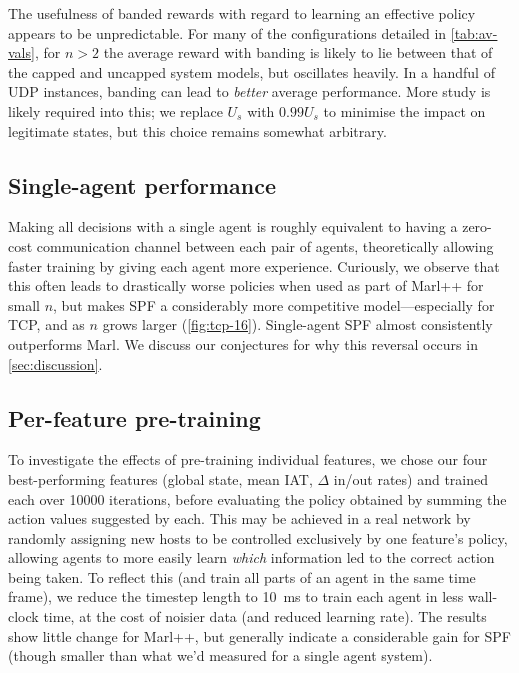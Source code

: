 \documentclass[conference, a4paper, 10pt, times]{IEEEtran}
\begin{document}
The usefulness of banded rewards with regard to learning an effective policy appears to be unpredictable.
For many of the configurations detailed in \cref{tab:av-vals}, for $n>2$ the average reward with banding is likely to lie between that of the capped and uncapped system models, but oscillates heavily.
In a handful of UDP instances, banding can lead to \emph{better} average performance.
More study is likely required into this; we replace $U_s$ with $0.99U_s$ to minimise the impact on legitimate states, but this choice remains somewhat arbitrary.

\subsection{Single-agent performance}
Making all decisions with a single agent is roughly equivalent to having a zero-cost communication channel between each pair of agents, theoretically allowing faster training by giving each agent more experience.
Curiously, we observe that this often leads to drastically worse policies when used as part of Marl++ for small $n$, but makes SPF a considerably more competitive model---especially for TCP, and as $n$ grows larger (\cref{fig:tcp-16}).
Single-agent SPF almost consistently outperforms Marl.
We discuss our conjectures for why this reversal occurs in \cref{sec:discussion}.

\subsection{Per-feature pre-training}
To investigate the effects of pre-training individual features, we chose our four best-performing features (global state, mean IAT, $\Delta$ in/out rates) and trained each over \num{10000} iterations, before evaluating the policy obtained by summing the action values suggested by each.
This may be achieved in a real network by randomly assigning new hosts to be controlled exclusively by one feature's policy, allowing agents to more easily learn \emph{which} information led to the correct action being taken.
To reflect this (and train all parts of an agent in the same time frame), we reduce the timestep length to \SI{10}{\milli\second} to train each agent in less wall-clock time, at the cost of noisier data (and reduced learning rate).
The results show little change for Marl++, but generally indicate a considerable gain for SPF (though smaller than what we'd measured for a single agent system).
\end{document}
